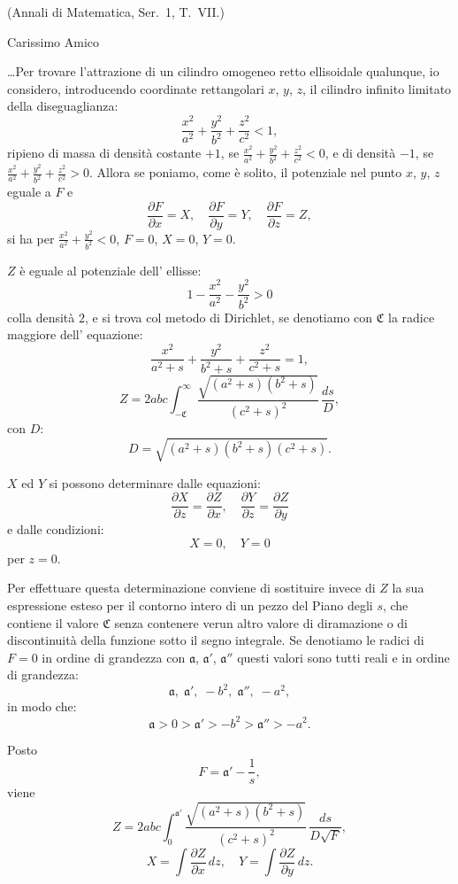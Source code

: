 \documentclass[12pt,a4paper]{article}
\begin{document}
\noindent\small{(Annali di Matematica, Ser.~1, T.~VII.)}

\medskip


Carissimo Amico

\dots Per trovare l'attrazione di un cilindro omogeneo retto ellisoidale qualunque, io considero, introducendo coordinate rettangolari $x$, $y$, $z$, il cilindro infinito limitato della diseguaglianza:
\[\frac{x^{2}}{a^{2}} + \frac{y^{2}}{b^{2}} + \frac{z^{2}}{c^{2}} < 1,\]
ripieno di massa di densit\`a costante $+1$, se $\frac{x^{2}}{a^{2}} + \frac{y^{2}}{b^{2}} + \frac{z^{2}}{c^{2}} < 0$, e di densit\`a $-1$, se $\frac{x^{2}}{a^{2}} + \frac{y^{2}}{b^{2}} + \frac{z^{2}}{c^{2}} > 0$. Allora se poniamo, come \`e solito, il potenziale nel punto $x$, $y$, $z$ eguale a $F$ e
\[\frac{\partial F}{\partial x} = X, \quad \frac{\partial F}{\partial y} = Y, \quad \frac{\partial F}{\partial z} = Z,\]
si ha per $\frac{x^{2}}{a^{2}} + \frac{y^{2}}{b^{2}} < 0$, $F = 0$, $X = 0$, $Y = 0$.

$Z$ \`e eguale al potenziale dell' ellisse:
\[1 - \frac{x^{2}}{a^{2}} - \frac{y^{2}}{b^{2}} > 0\]
colla densit\`a $2$, e si trova col metodo di Dirichlet, se denotiamo con $\mathfrak{C}$ la radice maggiore dell' equazione:
\[\frac{x^{2}}{a^{2}+s} + \frac{y^{2}}{b^{2}+s} + \frac{z^{2}}{c^{2}+s} = 1,\]
\[Z = 2abc \int_{-\mathfrak{C}}^{\infty} \frac{\sqrt{(a^{2}+s)(b^{2}+s)}}{(c^{2}+s)^{2}} \, \frac{ds}{D},\]
con $D$:
\[D = \sqrt{(a^{2}+s)(b^{2}+s)(c^{2}+s)}.\]

$X$ ed $Y$ si possono determinare dalle equazioni:
\[\frac{\partial X}{\partial z} = \frac{\partial Z}{\partial x}, \quad \frac{\partial Y}{\partial z} = \frac{\partial Z}{\partial y}\]
e dalle condizioni:
\[X = 0, \quad Y = 0\]
per $z = 0$.

Per effettuare questa determinazione conviene di sostituire invece di $Z$ la sua espressione esteso per il contorno intero di un pezzo del Piano degli $s$, che contiene il valore $\mathfrak{C}$ senza contenere verun altro valore di diramazione o di discontinuit\`a della funzione sotto il segno integrale. Se denotiamo le radici di $F=0$ in ordine di grandezza con $\mathfrak{a}$, $\mathfrak{a}'$, $\mathfrak{a}''$ questi valori sono tutti reali e in ordine di grandezza:
\[\mathfrak{a}, \; \mathfrak{a}', \; -b^{2}, \; \mathfrak{a}'', \; -a^{2},\]
in modo che:
\[\mathfrak{a} > 0 > \mathfrak{a}' > -b^{2} > \mathfrak{a}'' > -a^{2}.\]

Posto
\[F = \mathfrak{a}' - \frac{1}{s},\]
viene
\[Z = 2abc \int_{0}^{\mathfrak{a}'} \frac{\sqrt{(a^{2}+s)(b^{2}+s)}}{(c^{2}+s)^{2}} \, \frac{ds}{D\sqrt{F}},\]
\[X = \int \frac{\partial Z}{\partial x}\, dz, \quad Y = \int \frac{\partial Z}{\partial y}\, dz.\]
\end{document}
